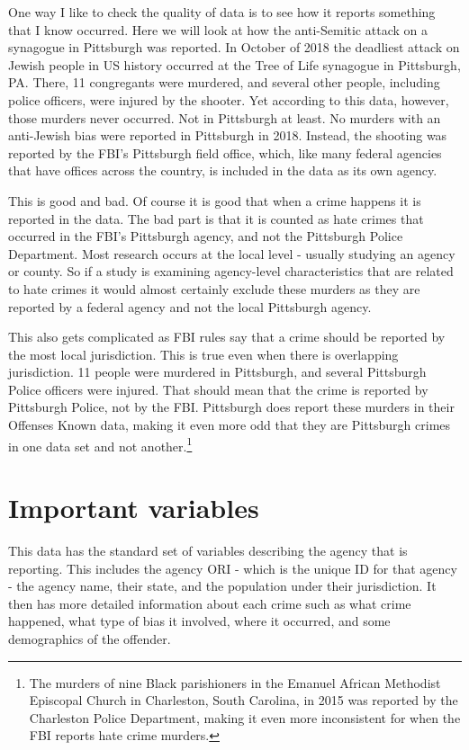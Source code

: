 \documentclass[
]{krantz}
\begin{document}
One way I like to check the quality of data is to see how it
reports something that I know occurred. Here we will look at
how the anti-Semitic attack on a synagogue in Pittsburgh was
reported. In October of 2018 the deadliest attack on Jewish
people in US history occurred at the Tree of Life synagogue
in Pittsburgh, PA. There, 11 congregants were murdered, and
several other people, including police officers, were
injured by the shooter. Yet according to this data, however,
those murders never occurred. Not in Pittsburgh at least. No
murders with an anti-Jewish bias were reported in Pittsburgh
in 2018. Instead, the shooting was reported by the FBI's
Pittsburgh field office, which, like many federal agencies
that have offices across the country, is included in the
data as its own agency.

This is good and bad. Of course it is good that when a crime
happens it is reported in the data. The bad part is that it
is counted as hate crimes that occurred in the FBI's
Pittsburgh agency, and not the Pittsburgh Police Department.
Most research occurs at the local level - usually studying
an agency or county. So if a study is examining agency-level
characteristics that are related to hate crimes it would
almost certainly exclude these murders as they are reported
by a federal agency and not the local Pittsburgh agency.

This also gets complicated as FBI rules say that a crime
should be reported by the most local jurisdiction. This is
true even when there is overlapping jurisdiction. 11 people
were murdered in Pittsburgh, and several Pittsburgh Police
officers were injured. That should mean that the crime is
reported by Pittsburgh Police, not by the FBI. Pittsburgh
does report these murders in their Offenses Known data,
making it even more odd that they are Pittsburgh crimes in
one data set and not another.\footnote{The murders of nine
  Black parishioners in the Emanuel African Methodist
  Episcopal Church in Charleston, South Carolina, in 2015
  was reported by the Charleston Police Department, making
  it even more inconsistent for when the FBI reports hate
  crime murders.}

\section{Important variables}\label{important-variables-6}

This data has the standard set of variables describing the
agency that is reporting. This includes the agency ORI -
which is the unique ID for that agency - the agency name,
their state, and the population under their jurisdiction. It
then has more detailed information about each crime such as
what crime happened, what type of bias it involved, where it
occurred, and some demographics of the offender.
\end{document}
